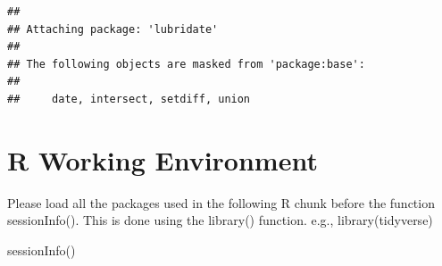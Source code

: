 \documentclass[
]{article}
\newenvironment{Shaded}{\begin{snugshade}}{\end{snugshade}}
\newcommand{\AttributeTok}[1]{\textcolor[rgb]{0.77,0.63,0.00}{#1}}
\newcommand{\CommentTok}[1]{\textcolor[rgb]{0.56,0.35,0.01}{\textit{#1}}}
\newcommand{\ConstantTok}[1]{\textcolor[rgb]{0.00,0.00,0.00}{#1}}
\newcommand{\DecValTok}[1]{\textcolor[rgb]{0.00,0.00,0.81}{#1}}
\newcommand{\FunctionTok}[1]{\textcolor[rgb]{0.00,0.00,0.00}{#1}}
\newcommand{\NormalTok}[1]{#1}
\newcommand{\SpecialCharTok}[1]{\textcolor[rgb]{0.00,0.00,0.00}{#1}}
\begin{document}
\begin{verbatim}
## 
## Attaching package: 'lubridate'
## 
## The following objects are masked from 'package:base':
## 
##     date, intersect, setdiff, union
\end{verbatim}

\begin{Shaded}
\end{Shaded}

\hypertarget{r-working-environment}{%
\section{R Working Environment}\label{r-working-environment}}

Please load all the packages used in the following R chunk before the
function sessionInfo(). This is done using the library() function. e.g.,
library(tidyverse)

\begin{Shaded}
\begin{Highlighting}[]
\FunctionTok{sessionInfo}\NormalTok{()}
\end{Highlighting}
\end{Shaded}
\end{document}
